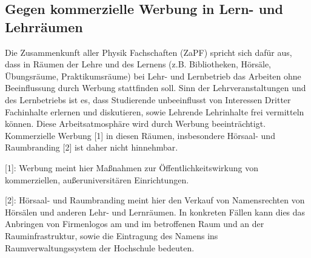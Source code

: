 
\subsection*{Gegen kommerzielle Werbung in Lern- und Lehrräumen}
Die Zusammenkunft aller Physik Fachschaften (ZaPF)  spricht sich dafür aus, dass in Räumen der Lehre und des Lernens (z.B. Bibliotheken, Hörsäle, Übungsräume, Praktikumsräume) bei Lehr- und Lernbetrieb das Arbeiten ohne Beeinflussung durch Werbung stattfinden soll. Sinn der Lehrveranstaltungen und des Lernbetriebs ist es, dass Studierende unbeeinflusst von Interessen Dritter Fachinhalte erlernen und diskutieren, sowie Lehrende Lehrinhalte frei vermitteln können. Diese Arbeitsatmosphäre wird durch Werbung beeinträchtigt.
Kommerzielle Werbung [1]  in diesen Räumen, insbesondere Hörsaal- und Raumbranding [2] ist daher nicht hinnehmbar.


[1]: Werbung meint hier Maßnahmen zur Öffentlichkeitswirkung von kommerziellen, außeruniversitären Einrichtungen.

[2]: Hörsaal- und Raumbranding meint hier den Verkauf von Namensrechten von Hörsälen und anderen Lehr- und Lernräumen. In konkreten Fällen kann dies das Anbringen von Firmenlogos am und im betroffenen Raum und an der Rauminfrastruktur, sowie die Eintragung des Namens ins Raumverwaltungssystem der Hochschule bedeuten.
